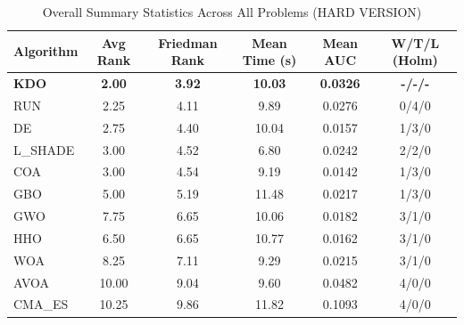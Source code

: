 \begin{table}[htbp]
\centering
\caption{Overall Summary Statistics Across All Problems (HARD VERSION)}
\label{tab:summary}
\small
\begin{tabular}{lccccc}
\toprule
\textbf{Algorithm} & \textbf{Avg Rank} & \textbf{Friedman Rank} & \textbf{Mean Time (s)} & \textbf{Mean AUC} & \textbf{W/T/L (Holm)} \\
\midrule
\textbf{KDO} & \textbf{2.00} & \textbf{3.92} & \textbf{10.03} & \textbf{0.0326} & \textbf{-/-/-} \\
RUN & 2.25 & 4.11 & 9.89 & 0.0276 & 0/4/0 \\
DE & 2.75 & 4.40 & 10.04 & 0.0157 & 1/3/0 \\
L_SHADE & 3.00 & 4.52 & 6.80 & 0.0242 & 2/2/0 \\
COA & 3.00 & 4.54 & 9.19 & 0.0142 & 1/3/0 \\
GBO & 5.00 & 5.19 & 11.48 & 0.0217 & 1/3/0 \\
GWO & 7.75 & 6.65 & 10.06 & 0.0182 & 3/1/0 \\
HHO & 6.50 & 6.65 & 10.77 & 0.0162 & 3/1/0 \\
WOA & 8.25 & 7.11 & 9.29 & 0.0215 & 3/1/0 \\
AVOA & 10.00 & 9.04 & 9.60 & 0.0482 & 4/0/0 \\
CMA_ES & 10.25 & 9.86 & 11.82 & 0.1093 & 4/0/0 \\
\bottomrule
\end{tabular}
\end{table}
